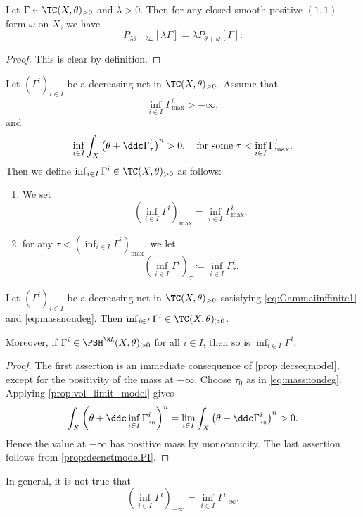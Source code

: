 \begin{lemma}\label{lma:testcurvrescompatible}
    Let $\Gamma\in \TC(X,\theta)_{>0}$ and $\lambda>0$. Then for any closed smooth positive $(1,1)$-form $\omega$ on $X$, we have
    \[
    P_{\lambda\theta+\lambda\omega}[\lambda\Gamma]=\lambda P_{\theta+\omega}[\Gamma].
    \]
\end{lemma}
\begin{proof}
    This is clear by definition.
\end{proof}

\begin{definition}\label{def:testcurinf}
    Let $(\Gamma^i)_{i\in I}$ be a decreasing net in $\TC(X,\theta)_{>0}$. Assume that
    \begin{equation}\label{eq:Gammaiinffinite1}
        \inf_{i\in I}\Gamma^{i}_{\max}>-\infty,
    \end{equation}
    and
    \begin{equation}\label{eq:massnondeg}
    \inf_{i\in I} \int_X \left( \theta+\ddc \Gamma^i_{\tau} \right)^n>0,\quad \textup{for some }\tau< \inf_{i\in I}\Gamma^{i}_{\max}.
    \end{equation}
    Then we define $\inf_{i\in I} \Gamma^{i}\in \TC(X,\theta)_{>0}$ as follows:
    \begin{enumerate}
        \item\label{itm:def:testcurinf:1} We set
        \[
            \left( \inf_{i\in I} \Gamma^{i} \right)_{\max}=\inf_{i\in I}\Gamma^{i}_{\max};
        \]
        \item\label{itm:def:testcurinf:2} for any $\tau<  \left( \inf_{i\in I} \Gamma^{i} \right)_{\max}$, we let
        \[
        \left( \inf_{i\in I} \Gamma^{i} \right)_{\tau}\coloneqq \inf_{i\in I} \Gamma^{i}_{\tau}.
        \]
    \end{enumerate}
\end{definition}

\begin{proposition}\label{prop:inftcistc}
    Let $(\Gamma^i)_{i\in I}$ be a decreasing net in $\TC(X,\theta)_{>0}$ satisfying \eqref{eq:Gammaiinffinite1} and \eqref{eq:massnondeg}. Then $\inf_{i\in I} \Gamma^{i}\in \TC(X,\theta)_{>0}$.

    Moreover, if $\Gamma^i\in \PSH^{\NA}(X,\theta)_{>0}$ for all $i\in I$, then so is $\inf_{i\in I} \Gamma^{i}$.
\end{proposition}
\begin{proof}
    The first assertion is an immediate consequence of \cref{prop:decseqmodel}, except for the positivity of the mass at $-\infty$. Choose $\tau_0$ as in \eqref{eq:massnondeg}. Applying \cref{prop:vol_limit_model} gives
    \[
        \int_X \left(\theta+\ddc\inf_{i\in I}\Gamma^i_{\tau_0}\right)^n
        =\lim_{i\in I}\int_X\left(\theta+\ddc\Gamma^{i}_{\tau_0}\right)^n>0.
    \]
    Hence the value at $-\infty$ has positive mass by monotonicity. The last assertion follows from \cref{prop:decnetmodelPI}.
\end{proof}
In general, it is not true that
\[
\left( \inf_{i\in I}\Gamma^{i} \right)_{-\infty}=\inf_{i\in I}\Gamma^{i}_{-\infty}.
\]

